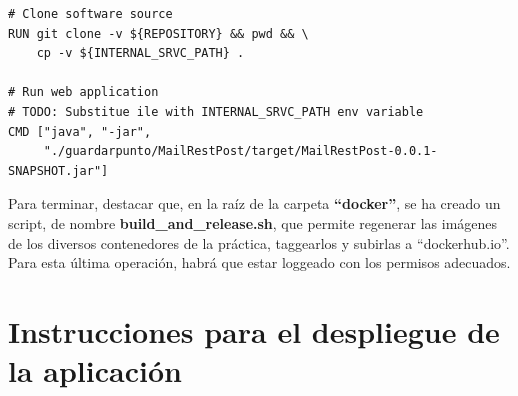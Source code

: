 \documentclass[12pt,spanish]{article}
\begin{document}
\begin{itemize}
\begin{verbatim}
# Clone software source
RUN git clone -v ${REPOSITORY} && pwd && \
    cp -v ${INTERNAL_SRVC_PATH} .

# Run web application
# TODO: Substitue ile with INTERNAL_SRVC_PATH env variable
CMD ["java", "-jar",
     "./guardarpunto/MailRestPost/target/MailRestPost-0.0.1-SNAPSHOT.jar"]
\end{verbatim}
\end{itemize}

Para terminar, destacar que, en la raíz de la carpeta \textbf{``docker''}, se ha creado un script, de nombre \textbf{build\_and\_release.sh}, que permite regenerar las imágenes de los diversos contenedores de la práctica, taggearlos y subirlas a ``dockerhub.io''. Para esta última operación, habrá que estar loggeado con los permisos adecuados.

\pagebreak
\section{Instrucciones para el despliegue de la aplicación}
\label{sec:instructions}
\end{document}
